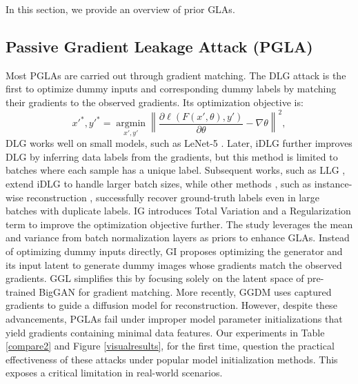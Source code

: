 In this section, we provide an overview of prior GLAs.

\subsection{Passive Gradient Leakage Attack (PGLA)}
Most PGLAs are carried out through gradient matching. The DLG attack \cite{zhu2019deep} is the first to optimize dummy inputs and corresponding dummy labels by matching their gradients to the observed gradients. Its optimization objective is: %
\begin{equation}
\label{dlg}
    x'^*,y'^*=\underset{x',y'}{\operatorname*{argmin}}\left\|\frac{\partial\ell(F(x',\theta),y')}{\partial\theta}-\nabla\theta\right\|^2,
\end{equation}
DLG works well on small models, such as LeNet-5 \cite{lecun1998gradient}. Later, iDLG \cite{zhao2020idlg} further improves DLG by inferring data labels from the gradients, but this method is limited to batches where each sample has a unique label. Subsequent works, such as LLG \cite{wainakh2022user}, extend iDLG to handle larger batch sizes, while other methods \cite{ma2023instance, wangtowards}, such as instance-wise reconstruction \cite{ma2023instance}, successfully recover ground-truth labels even in large batches with duplicate labels. IG \cite{geiping2020inverting} introduces Total Variation and a Regularization term to improve the optimization objective further. The study \cite{yin2021see} leverages the mean and variance from batch normalization layers as priors to enhance GLAs. Instead of optimizing dummy inputs directly, GI \cite{jeon2021gradient} proposes optimizing the generator and its input latent to generate dummy images whose gradients match the observed gradients. GGL \cite{li2022auditing} simplifies this by focusing solely on the latent space of pre-trained BigGAN for gradient matching. More recently, GGDM \cite{gu2024federated} uses captured gradients to guide a diffusion model for reconstruction. However, despite these advancements, PGLAs fail under improper model parameter initializations that yield gradients containing minimal data features. Our experiments in Table \ref{compare2} and Figure \ref{visualresults}, for the first time, question the practical effectiveness of these attacks under popular model initialization methods. This exposes a critical limitation in real-world scenarios.

